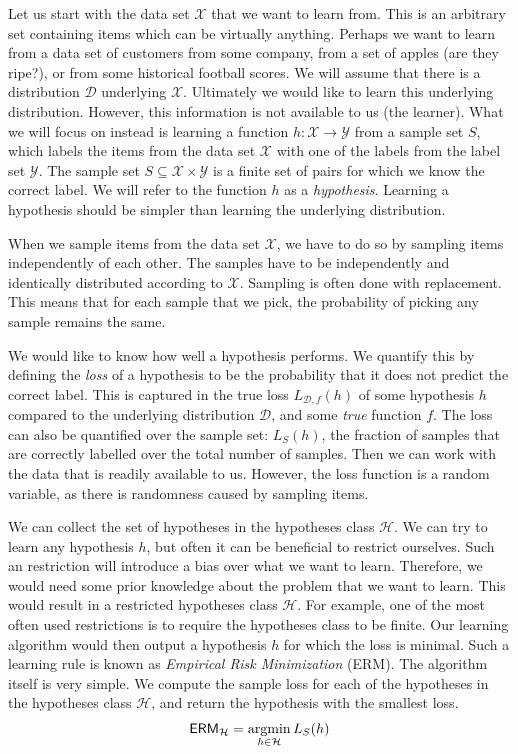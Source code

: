\documentclass[../main.tex]{subfiles}
\begin{document}
Let us start with the data set $\mathcal{X}$ that we want to learn from.
This is an arbitrary set containing items which can be virtually anything.
Perhaps we want to learn from a data set of customers from some company, from a set of apples (are they ripe?), or from some historical football scores.
We will assume that there is a distribution $\mathcal{D}$ underlying $\mathcal{X}$.
Ultimately we would like to learn this underlying distribution.
However, this information is not available to us (the learner).
What we will focus on instead is learning a function $h: \mathcal{X} \to \mathcal{Y} $ from a sample set $S$,
which labels the items from the data set $\mathcal{X}$ with one of the labels from the label set $\mathcal{Y}$.
The sample set $S \subseteq \mathcal{X} \times \mathcal{Y}$ is a finite set of pairs for which we know the correct label.
We will refer to the function $h$ as a \emph{hypothesis}.
Learning a hypothesis should be simpler than learning the underlying distribution.
\cite[Chapter~2]{Shalev2014understanding}

When we sample items from the data set $\mathcal{X}$, we have to do so by sampling items independently of each other.
The samples have to be independently and identically distributed according to $\mathcal{X}$.
Sampling is often done with replacement.
This means that for each sample that we pick, the probability of picking any sample remains the same.
 
We would like to know how well a hypothesis performs.
We quantify this by defining the \emph{loss} of a hypothesis to be the probability that it does not predict the correct label.
This is captured in the true loss $L_{\mathcal{D}, f}(h)$
of some hypothesis $h$ compared to the underlying distribution $\mathcal{D}$, and some \emph{true} function $f$.
The loss can also be quantified over the sample set: $L_S(h)$, the fraction of samples that are correctly labelled over the total number of samples.
Then we can work with the data that is readily available to us.
However, the loss function is a random variable, as there is randomness caused by sampling items.
\cite[Chapter~2]{Shalev2014understanding}

We can collect the set of hypotheses in the hypotheses class $\mathcal{H}$.
We can try to learn any hypothesis $h$, but often it can be beneficial to restrict ourselves.
Such an restriction will introduce a bias over what we want to learn.
Therefore, we would need some prior knowledge about the problem that we want to learn.
This would result in a restricted hypotheses class $\mathcal{H}$.
For example, one of the most often used restrictions is to require the hypotheses class to be finite.
Our learning algorithm would then output a hypothesis $h$ for which the loss is minimal.
Such a learning rule is known as \emph{Empirical Risk Minimization} (ERM).
The algorithm itself is very simple.
We compute the sample loss for each of the hypotheses in the hypotheses class $\mathcal{H}$, and return the hypothesis with the smallest loss.
\begin{align}
    \label{eq:erm}
    \mathsf{ERM}_{\mathcal{H}} = \operatorname*{argmin}_{h \in \mathcal{H}} L_S(h)
\end{align}
\cite[Chapter~2]{Shalev2014understanding}
\end{document}
